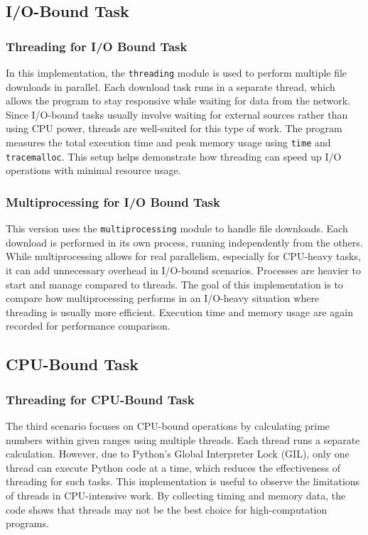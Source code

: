 \documentclass[onecolumn]{article}
\begin{document}
\subsection{I/O-Bound Task}
\subsubsection{Threading for I/O Bound Task}
In this implementation, the \verb|threading| module is used to perform multiple file downloads in parallel. Each download task runs in a separate thread, which allows the program to stay responsive while waiting for data from the network. Since I/O-bound tasks usually involve waiting for external sources rather than using CPU power, threads are well-suited for this type of work. The program measures the total execution time and peak memory usage using \verb|time| and \verb|tracemalloc|. This setup helps demonstrate how threading can speed up I/O operations with minimal resource usage. 

\subsubsection{Multiprocessing for I/O Bound Task}
This version uses the \verb|multiprocessing| module to handle file downloads. Each download is performed in its own process, running independently from the others. While multiprocessing allows for real parallelism, especially for CPU-heavy tasks, it can add unnecessary overhead in I/O-bound scenarios. Processes are heavier to start and manage compared to threads. The goal of this implementation is to compare how multiprocessing performs in an I/O-heavy situation where threading is usually more efficient. Execution time and memory usage are again recorded for performance comparison. 

\subsection{CPU-Bound Task}
\subsubsection{Threading for CPU-Bound Task}
The third scenario focuses on CPU-bound operations by calculating prime numbers within given ranges using multiple threads. Each thread runs a separate calculation. However, due to Python's Global Interpreter Lock (GIL), only one thread can execute Python code at a time, which reduces the effectiveness of threading for such tasks. This implementation is useful to observe the limitations of threads in CPU-intensive work. By collecting timing and memory data, the code shows that threads may not be the best choice for high-computation programs.
\end{document}
